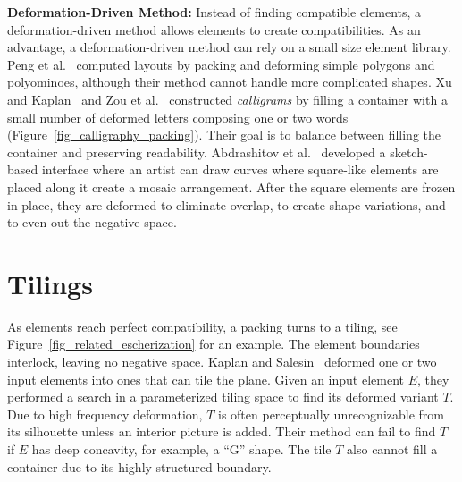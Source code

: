 \newtext
{
\textbf{Deformation-Driven Method:}
Instead of finding compatible elements,
a deformation-driven method allows elements to create compatibilities.
As an advantage, a deformation-driven method can rely on a small size element library.
Peng et al.~\cite{Peng2014} computed layouts by packing and deforming
simple polygons and polyominoes, although their method cannot handle more
complicated shapes.
Xu and Kaplan~\cite{Xu2007} and Zou et al.~\cite{Zou2016}
constructed \textit{calligrams} by filling a container with a small
number of deformed letters composing one or two words (Figure~\ref{fig_calligraphy_packing}).  
Their goal is to balance between filling the container and preserving readability.
Abdrashitov et al.~\cite{Abdrashitov2014} developed
a sketch-based interface where an artist can draw curves where square-like elements are placed along it
create a mosaic arrangement.
After the square elements are frozen in place, 
they are deformed to eliminate overlap, to create shape variations, 
and to even out the negative space.  
}




\section{Tilings}

\newtext
{
As elements reach perfect compatibility, a packing turns to a tiling, see Figure~\ref{fig_related_escherization} for an example.
The element boundaries interlock, leaving no negative space.
Kaplan and Salesin~\cite{Kaplan2000, Kaplan2004} deformed one or two 
input elements into ones that can tile the plane.
Given an input element $E$, they performed a search in a parameterized tiling space to find its
deformed variant $T$.
Due to high frequency deformation,
$T$ is often perceptually unrecognizable from its silhouette unless an interior picture is added.
Their method can fail to find $T$ if $E$ has deep concavity, for example, a ``G'' shape.
The tile $T$ also cannot fill a container due to its highly structured boundary.
}

